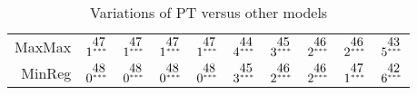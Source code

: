 \begin{table}[!htb]
\begin{tabular}{rlllllllll}
  MaxMax & $1^{\stackrel{\textstyle47\hfill}{\scriptscriptstyle***\hfill}}$ & $1^{\stackrel{\textstyle47\hfill}{\scriptscriptstyle***\hfill}}$ & $1^{\stackrel{\textstyle47\hfill}{\scriptscriptstyle***\hfill}}$ & $1^{\stackrel{\textstyle47\hfill}{\scriptscriptstyle***\hfill}}$ & $4^{\stackrel{\textstyle44\hfill}{\scriptscriptstyle***\hfill}}$ & $3^{\stackrel{\textstyle45\hfill}{\scriptscriptstyle***\hfill}}$ & $2^{\stackrel{\textstyle46\hfill}{\scriptscriptstyle***\hfill}}$ & $2^{\stackrel{\textstyle46\hfill}{\scriptscriptstyle***\hfill}}$ & $5^{\stackrel{\textstyle43\hfill}{\scriptscriptstyle***\hfill}}$ \\ 
  MinReg & $0^{\stackrel{\textstyle48\hfill}{\scriptscriptstyle***\hfill}}$ & $0^{\stackrel{\textstyle48\hfill}{\scriptscriptstyle***\hfill}}$ & $0^{\stackrel{\textstyle48\hfill}{\scriptscriptstyle***\hfill}}$ & $0^{\stackrel{\textstyle48\hfill}{\scriptscriptstyle***\hfill}}$ & $3^{\stackrel{\textstyle45\hfill}{\scriptscriptstyle***\hfill}}$ & $2^{\stackrel{\textstyle46\hfill}{\scriptscriptstyle***\hfill}}$ & $2^{\stackrel{\textstyle46\hfill}{\scriptscriptstyle***\hfill}}$ & $1^{\stackrel{\textstyle47\hfill}{\scriptscriptstyle***\hfill}}$ & $6^{\stackrel{\textstyle42\hfill}{\scriptscriptstyle***\hfill}}$ \\ 
   \hline
\end{tabular}
\caption{Variations of PT versus other models} 
\label{table6_PT_variations_vs_other_models}
\end{table}
